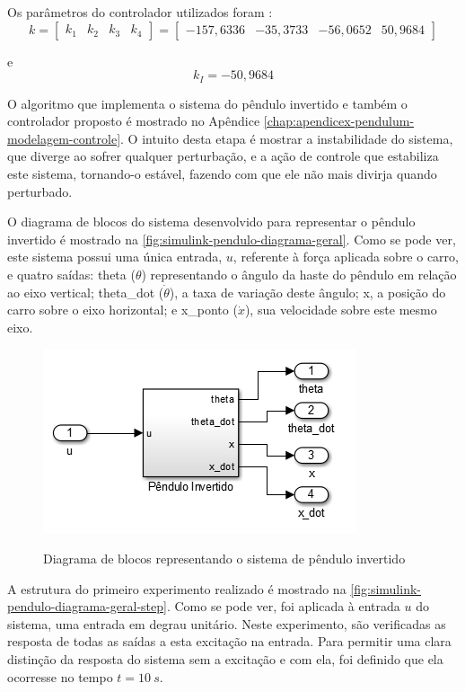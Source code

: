 Os parâmetros do controlador utilizados foram \cite[p.~749]{Ogata2010}:
\[
	k = 
		\begin{bmatrix}
			k_1 &
			k_2 &
			k_3 &
			k_4
		\end{bmatrix} =
		\begin{bmatrix}
			-157,6336 &
			-35,3733 &
			-56,0652 &
			50,9684
		\end{bmatrix}
\]

e
\[
k_I = -50,9684
\]

O algoritmo que implementa o sistema do pêndulo invertido e também o controlador proposto é mostrado no Apêndice \ref{chap:apendicex-pendulum-modelagem-controle}. O intuito desta etapa é mostrar a instabilidade do sistema, que diverge ao sofrer qualquer perturbação, e a ação de controle que estabiliza este sistema, tornando-o estável, fazendo com que ele não mais divirja quando perturbado.

O diagrama de blocos do sistema desenvolvido para representar o pêndulo invertido é mostrado na \autoref{fig:simulink-pendulo-diagrama-geral}. Como se pode ver, este sistema possui uma única entrada, $u$, referente à força aplicada sobre o carro, e quatro saídas: theta ($\theta$) representando o ângulo da haste do pêndulo em relação ao eixo vertical; theta\_dot ($\dot{\theta}$), a taxa de variação deste ângulo; x, a posição do carro sobre o eixo horizontal; e x\_ponto ($\dot{x}$), sua velocidade sobre este mesmo eixo.

\begin{figure}[!htb]
    \centering
    \caption{Diagrama de blocos representando o sistema de pêndulo invertido}
    \includegraphics[width=.6\textwidth]{./04-figuras/simulink_pendulo/diagrama_geral}
    \label{fig:simulink-pendulo-diagrama-geral}
\end{figure}

A estrutura do primeiro experimento realizado é mostrado na \autoref{fig:simulink-pendulo-diagrama-geral-step}. Como se pode ver, foi aplicada à entrada $u$ do sistema, uma entrada em degrau unitário. Neste experimento, são verificadas as resposta de todas as saídas a esta excitação na entrada. Para permitir uma clara distinção da resposta do sistema sem a excitação e com ela, foi definido que ela ocorresse no tempo $t=10\ s$.

